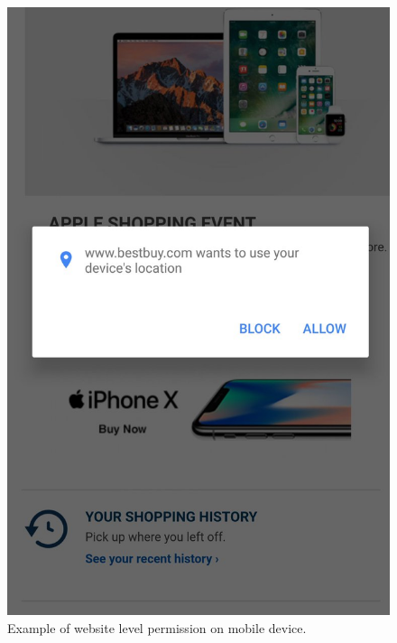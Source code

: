 \begin{figure}[h]
\begin{center}
\includegraphics[scale=0.25]{figs/website_level_permission.jpg}
\caption{Example of website level permission on mobile device.}
\label{website_level_permission}
\end{center}
\end{figure}

